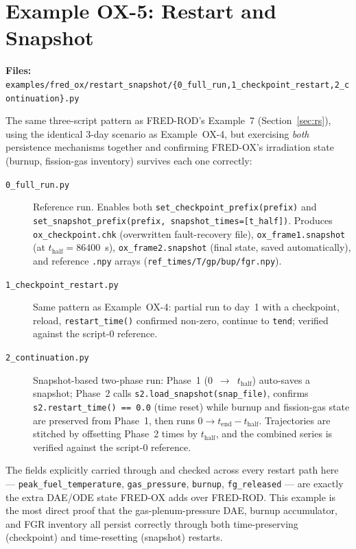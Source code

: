 \documentclass[11pt,a4paper]{article}
\begin{document}
\section{Example OX-5: Restart and Snapshot}
\label{sec:ox-rs}

\textbf{Files:} \texttt{examples/fred\_ox/restart\_snapshot/\{0\_full\_run,1\_checkpoint\_restart,2\_continuation\}.py}

\medskip
The same three-script pattern as FRED-ROD's Example~7 (Section~\ref{sec:rs}),
using the identical 3-day scenario as Example~OX-4, but exercising
\emph{both} persistence mechanisms together and confirming FRED-OX's
irradiation state (burnup, fission-gas inventory) survives each one
correctly:

\begin{description}
  \item[\texttt{0\_full\_run.py}] Reference run.  Enables both
        \texttt{set\_checkpoint\_prefix(prefix)} and
        \texttt{set\_snapshot\_prefix(prefix, snapshot\_times=[t\_half])}.
        Produces \texttt{ox\_checkpoint.chk} (overwritten fault-recovery
        file), \texttt{ox\_frame1.snapshot} (at $t_\text{half}=86400$~s),
        \texttt{ox\_frame2.snapshot} (final state, saved automatically), and
        reference \texttt{.npy} arrays (\texttt{ref\_times/T/gp/bup/fgr.npy}).
  \item[\texttt{1\_checkpoint\_restart.py}] Same pattern as Example~OX-4:
        partial run to day~1 with a checkpoint, reload, \texttt{restart\_time()}
        confirmed non-zero, continue to \texttt{tend}; verified against the
        script-0 reference.
  \item[\texttt{2\_continuation.py}] Snapshot-based two-phase run: Phase~1
        (0~$\to$~$t_\text{half}$) auto-saves a snapshot; Phase~2 calls
        \texttt{s2.load\_snapshot(snap\_file)}, confirms
        \texttt{s2.restart\_time() == 0.0} (time reset) while burnup and
        fission-gas state are preserved from Phase~1, then runs
        $0 \to t_\text{end} - t_\text{half}$.  Trajectories are stitched by
        offsetting Phase~2 times by $t_\text{half}$, and the combined series
        is verified against the script-0 reference.
\end{description}

\begin{infobox}
  The fields explicitly carried through and checked across every restart
  path here --- \texttt{peak\_fuel\_temperature}, \texttt{gas\_pressure},
  \texttt{burnup}, \texttt{fg\_released} --- are exactly the extra DAE/ODE
  state FRED-OX adds over FRED-ROD.  This example is the most direct proof
  that the gas-plenum-pressure DAE, burnup accumulator, and FGR inventory
  all persist correctly through both time-preserving (checkpoint) and
  time-resetting (snapshot) restarts.
\end{infobox}
\end{document}
